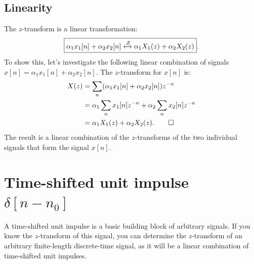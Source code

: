 \subsection{Linearity}
The $z$-transform is a linear transformation:
\begin{equation}
  \boxed{
  \alpha_1 x_1[n] + \alpha_2 x_2[n] \xleftrightarrow{\mathcal{Z}} \alpha_1 X_1(z) + \alpha_2 X_2(z)}.
\end{equation}
To show this, let's investigate the following linear combination of
signals $x[n]=\alpha_1 x_1[n] + \alpha_2 x_2[n]$. The $z$-transform for
$x[n]$ is:
\begin{align}
  X(z) & = \sum_{n}(\alpha_1 x_1[n] + \alpha_2 x_2[n])z^{-n}            \\
       & = \alpha_1 \sum_n x_1[n]z^{-n} + \alpha_2 \sum_n x_2[n] z^{-n} \\
       & = \alpha_1 X_1(z) + \alpha_2 X_2(z). \qed
\end{align}
The result is a linear combination of the $z$-transforms of the two
individual signals that form the signal $x[n]$.


\section{Time-shifted unit impulse $\delta[n-n_0]$}

\begin{marginfigure}
  \begin{center}
  \end{center}
  \caption{A time-shifted unit impulse is a basic building block of
    arbitrary signals. If you know the $z$-transform of this signal, you
    can determine the $z$-transform of an arbitrary finite-length
    discrete-time signal, as it will be a linear combination of time-shifted unit impulses.}
\end{marginfigure}

